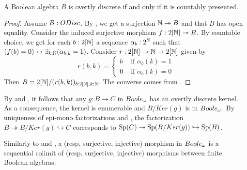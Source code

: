 \begin{corollary}\label{ODiscBAareBoole}
  A Boolean algebra $B$ is overtly discrete if and only if it is countably presented. 
\end{corollary}
\begin{proof}
  Assume $B:\ODisc$. 
  By , we get a surjection $\mathbb{N}\twoheadrightarrow B$ and that $B$ has open equality. 
  Consider the induced surjective morphism $f:2[\mathbb{N}]\twoheadrightarrow B$.
  By countable choice, we get for each $b:2[\mathbb{N}]$
  a sequence $\alpha_{b}:2^{\mathbb{N}}$ such that 
  $(f(b) = 0)\leftrightarrow \exists_{k:\mathbb{N}} (\alpha_{b,k}=1)$. 
  Consider 
  $r:2[\mathbb{N}] \to \mathbb{N} \to 2[\mathbb{N}]$ 
  given by 
  \[r(b,k) =\begin{cases}
    b &\text{ if } \alpha_{b}(k) = 1\\
    0   &\text{ if } \alpha_{b}(k) = 0
  \end{cases}
  \] 
  Then $B= 2[\mathbb{N}]/(r(b,k))_{b:2[\mathbb{N}],k:\mathbb{N}}$.
  The converse comes from .
\end{proof}

\begin{remark}\label{BooleEpiMono}
  By  and , 
  it follows that any 
  $g:B\to C$ in $\Boole$ has an overtly discrete kernel.
  As a consequence, the kernel is enumerable and $B/Ker(g)$ is in $\Boole$. 
  By uniqueness of epi-mono factorizations and , 
  the factorization 
  $B\twoheadrightarrow B/Ker(g) \hookrightarrow C$ corresponds to 
  $\operatorname{Sp}(C) \twoheadrightarrow \operatorname{Sp}(B/Ker(g)) \hookrightarrow \operatorname{Sp}(B)$. 
\end{remark}
\begin{remark}\label{decompositionBooleMaps}
  Similarly to  and 
  , a (resp. surjective, injective) morphism
  in $\Boole$ is a sequential colimit of (resp. surjective, injective) morphisms between 
  finite Boolean algebras.
\end{remark}
